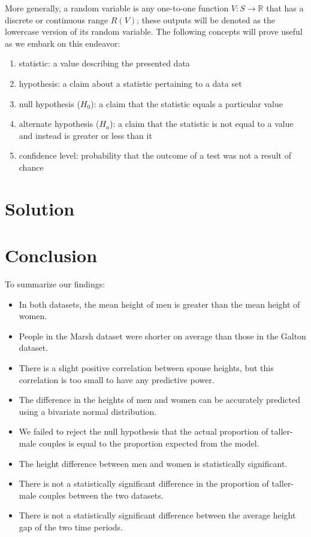 \documentclass{article}
\begin{document}
More generally, a random variable is any one-to-one function $V:S\rightarrow{\mathbb{R}}$ that has a discrete or continuous range $R(V)$; these outputs will be denoted as the lowercase version of its random variable.
The following concepts will prove useful as we embark on this endeavor:
\begin{enumerate}
    \item statistic: a value describing the presented data
    \item  hypothesis: a claim about a statistic pertaining to a data set
    \item null hypothesis ($H_0$): a claim that the statistic equals a particular value
    \item alternate hypothesis ($H_a$): a claim that the statistic is not equal to a value and instead is greater or less than it
    \item confidence level: probability that the outcome of a test was not a result of chance
\end{enumerate}

\section{Solution}\label{sec:solution}


\section{Conclusion}\label{sec:conclusion}
To summarize our findings:

\begin{itemize}
    \item In both datasets, the mean height of men is greater than the mean height of women.
    \item People in the Marsh dataset were shorter on average than those in the Galton dataset.
    \item There is a slight positive correlation between spouse heights, but this correlation is too small to have any predictive power.
    \item The difference in the heights of men and women can be accurately predicted using a bivariate normal distribution.
    \item We failed to reject the null hypothesis that the actual proportion of taller-male couples is equal to the proportion expected from the model.
    \item The height difference between men and women is statistically significant.
    \item There is not a statistically significant difference in the proportion of taller-male couples between the two datasets.
    \item There is not a statistically significant difference between the average height gap of the two time periods.
\end{itemize}
\end{document}
